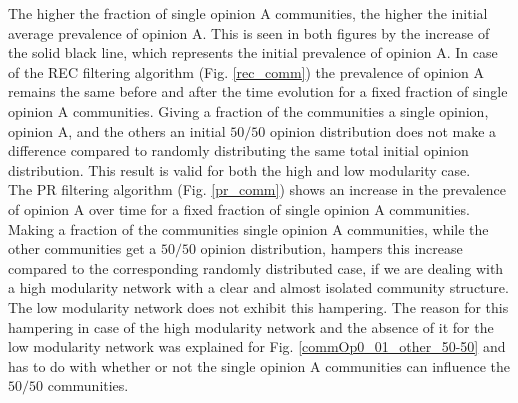 \documentclass[11 pt , letterpaper , twoside , openright]{book}
\begin{document}
\newline
The higher the fraction of single opinion A communities, the higher the initial average prevalence of opinion A. This is seen in both figures by the increase of the solid black line, which represents the initial prevalence of opinion A. In case of the REC filtering algorithm (Fig. \ref{rec_comm}) the prevalence of opinion A remains the same before and after the time evolution for a fixed fraction of single opinion A communities. Giving a fraction of the communities a single opinion, opinion A, and the others an initial $50/50$ opinion distribution does not make a difference compared to randomly distributing the same total initial opinion distribution. This result is valid for both the high and low modularity case.\\
\newline
The PR filtering algorithm (Fig. \ref{pr_comm}) shows an increase in the prevalence of opinion A over time for a fixed fraction of single opinion A communities. Making a fraction of the communities single opinion A communities, while the other communities get a $50/50$ opinion distribution, hampers this increase compared to the corresponding randomly distributed case, if we are dealing with a high modularity network with a clear and almost isolated community structure. The low modularity network does not exhibit this hampering. The reason for this hampering in case of the high modularity network and the absence of it for the low modularity network was explained for Fig. \ref{commOp0_01_other_50-50} and has to do with whether or not the single opinion A communities can influence the $50/50$ communities. 
\end{document}

